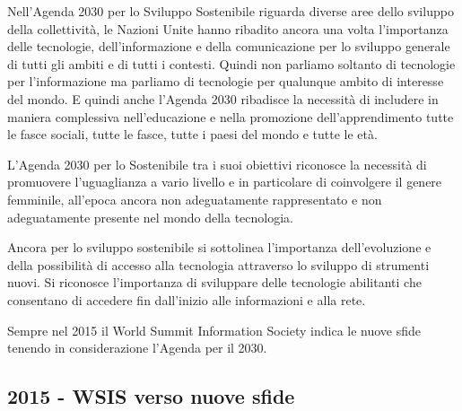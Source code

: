  Nell'Agenda 2030 per lo Sviluppo Sostenibile riguarda diverse aree dello sviluppo della collettività, le Nazioni Unite hanno ribadito ancora una volta l'importanza delle tecnologie, dell'informazione e della comunicazione per lo sviluppo generale di tutti gli ambiti e di tutti i contesti. Quindi non parliamo soltanto di tecnologie per l'informazione ma parliamo di tecnologie per qualunque ambito di interesse del mondo. E quindi anche l'Agenda 2030 ribadisce la necessità di includere in maniera complessiva nell'educazione e nella promozione dell'apprendimento tutte le fasce sociali, tutte le fasce, tutte i paesi del mondo e tutte le età. \par
 L'Agenda 2030 per lo Sostenibile tra i suoi obiettivi riconosce la necessità di promuovere l'uguaglianza a vario livello e in particolare di coinvolgere il genere femminile, all'epoca ancora non adeguatamente rappresentato e non adeguatamente presente nel mondo della tecnologia.\par 
 Ancora per lo sviluppo sostenibile si sottolinea l'importanza dell'evoluzione e della possibilità di accesso alla tecnologia attraverso lo sviluppo di strumenti nuovi. Si riconosce l'importanza di sviluppare delle tecnologie abilitanti che consentano di accedere fin dall'inizio alle informazioni e alla rete. \par
 Sempre nel 2015 il World Summit Information Society indica le nuove sfide tenendo in considerazione l'Agenda per il 2030. 
 \subsection{2015 - WSIS verso nuove sfide}

